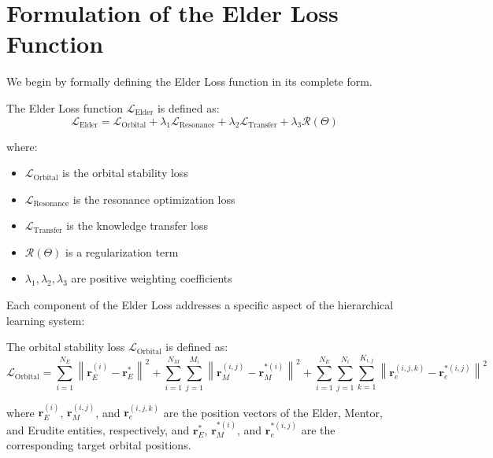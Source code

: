 \section{Formulation of the Elder Loss Function}

We begin by formally defining the Elder Loss function in its complete form.

\begin{definition}
The Elder Loss function $\mathcal{L}_{\text{Elder}}$ is defined as:
\begin{equation}
\mathcal{L}_{\text{Elder}} = \mathcal{L}_{\text{Orbital}} + \lambda_1 \mathcal{L}_{\text{Resonance}} + \lambda_2 \mathcal{L}_{\text{Transfer}} + \lambda_3 \mathcal{R}(\Theta)
\end{equation}

where:
\begin{itemize}
    \item $\mathcal{L}_{\text{Orbital}}$ is the orbital stability loss
    \item $\mathcal{L}_{\text{Resonance}}$ is the resonance optimization loss
    \item $\mathcal{L}_{\text{Transfer}}$ is the knowledge transfer loss
    \item $\mathcal{R}(\Theta)$ is a regularization term
    \item $\lambda_1, \lambda_2, \lambda_3$ are positive weighting coefficients
\end{itemize}
\end{definition}

Each component of the Elder Loss addresses a specific aspect of the hierarchical learning system:

\begin{definition}
The orbital stability loss $\mathcal{L}_{\text{Orbital}}$ is defined as:
\begin{equation}
\mathcal{L}_{\text{Orbital}} = \sum_{i=1}^{N_E} \left\|\mathbf{r}_E^{(i)} - \mathbf{r}_E^{*}\right\|^2 + \sum_{i=1}^{N_M} \sum_{j=1}^{M_i} \left\|\mathbf{r}_M^{(i,j)} - \mathbf{r}_M^{*(i)}\right\|^2 + \sum_{i=1}^{N_E} \sum_{j=1}^{N_i} \sum_{k=1}^{K_{i,j}} \left\|\mathbf{r}_e^{(i,j,k)} - \mathbf{r}_e^{*(i,j)}\right\|^2
\end{equation}

where $\mathbf{r}_E^{(i)}$, $\mathbf{r}_M^{(i,j)}$, and $\mathbf{r}_e^{(i,j,k)}$ are the position vectors of the Elder, Mentor, and Erudite entities, respectively, and $\mathbf{r}_E^{*}$, $\mathbf{r}_M^{*(i)}$, and $\mathbf{r}_e^{*(i,j)}$ are the corresponding target orbital positions.
\end{definition}

